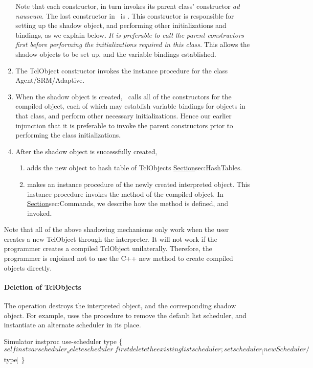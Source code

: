 \begin{enumerate}
  Note that each constructor,
  in turn invokes its parent class' constructor \textit{ad nauseum}.
  The last constructor in \ns\ is
  .
  This constructor is responsible for setting up the shadow object, and 
  performing other initializations and bindings, as we explain below.
  \emph{It is preferable to call the parent constructors first before
    performing the initializations required in this class.}
  This allows the shadow objects to be set up,
  and the variable bindings established.
\item The TclObject constructor invokes the instance procedure
   for the class Agent/SRM/Adaptive.
\item When the shadow object is created,
  \ns\ calls all of the constructors for the compiled object,
  each of which may establish variable bindings for objects in that class,
  and perform other necessary initializations.
  Hence our earlier injunction that it is preferable to invoke the parent
  constructors prior to performing the class initializations.
\item After the shadow object is successfully created,
  \begin{enumerate}
  \item adds the new object to hash table of TclObjects
        \href{described earlier}{Section}{sec:HashTables}.
  \item makes  an instance procedure of the newly created
    interpreted object.
    This instance procedure
    invokes the  method of the compiled object.
    In \href{a later subsection}{Section}{sec:Commands},
    we describe how the  method is defined, and invoked.
  \end{enumerate}
\end{enumerate}
Note that all of the above shadowing mechanisms only work when
the user creates a new TclObject through the interpreter.
It will not work if the programmer creates a compiled TclObject unilaterally.
Therefore, the programmer is enjoined not to use the C++ new method
to create compiled objects directly.

\paragraph{Deletion of TclObjects}
The  operation
destroys the interpreted object, and the corresponding shadow object.
For example,
uses the  procedure to remove the default list scheduler,
and instantiate an alternate scheduler in its place.
\begin{program}
        Simulator instproc use-scheduler type \{
                $self instvar scheduler_

                delete scheduler_ \; first delete the existing list scheduler;
                set scheduler_ [new Scheduler/$type]
        \}
\end{program}

